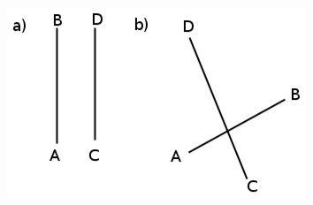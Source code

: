 	\begin{figure}[H] %
    \begin{center}
    \label{m39108*uid4212!!!underscore!!!media}\label{m39108*uid4212!!!underscore!!!printimage}\includegraphics{col11306.imgs/m39108_geom.png} %
        
      \vspace{2pt}
    \vspace{.1in}
    
    \end{center}

 \end{figure}   

    \addtocounter{footnote}{-0}
    

